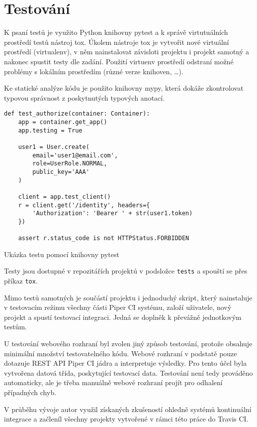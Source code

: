 \chapter{Testování}

K psaní testů je využito Python knihovny pytest a k správě virtutuálních prostředí testů nástroj tox.
Úkolem nástroje tox je vytvořit nové virtuální prostředí (virtualenv), v něm nainstalovat závisloti projektu i projekt samotný a nakonec spustit testy dle zadání.
Použití virtuenv prostředí odstraní možné problémy s lokálním prostředím (různé verze knihoven, \ldots).

Ke statické analýze kódu je použito knihovny mypy, která dokáže zkontrolovat typovou správnost z poskytnutých typových anotací.

\begin{listing}[ht]
\begin{verbatim}
def test_authorize(container: Container):
    app = container.get_app()
    app.testing = True

    user1 = User.create(
        email='user1@email.com',
        role=UserRole.NORMAL,
        public_key='AAA'
    )

    client = app.test_client()
    r = client.get('/identity', headers={
        'Authorization': 'Bearer ' + str(user1.token)
    })

    assert r.status_code is not HTTPStatus.FORBIDDEN
\end{verbatim}
\caption{Ukázka testu pomocí knihovny pytest}
\end{listing}

Testy jsou dostupné v repozitářích projektů v podsložce \verb|tests| a spouští se přes příkaz \verb|tox|.

Mimo testů samotných je součástí projektu i jednoduchý skript, který nainstaluje v testovacím režimu všechny části Piper CI systému, založí uživatele, nový projekt a spustí testovací integraci.
Jedná se doplněk k převážně jednotkovým testům.

U testování webového rozhraní byl zvolen jiný způsob testování, protože obsahuje minimální množství testovatelného kódu.
Webové rozhraní v podstatě pouze dotazuje REST API Piper CI jádra a interpretuje výsledky.
Pro tento účel byla vytvořena  datová třída, poskytující testovací data.
Testování není tedy prováděno automaticky, ale je třeba manuálně webové rozhraní projít pro odhalení případných chyb.

V průběhu vývoje autor využil získaných zkušeností ohledně systémů kontinuální integrace a začleníl všechny projekty vytvořené v rámci této práce do Travis CI.